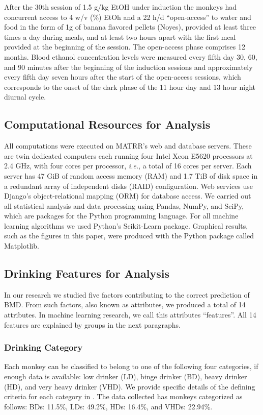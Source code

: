 \documentclass{bmcart}
\begin{document}
After the 30th session of 1.5 g/kg EtOH under induction the monkeys had
concurrent access to 4 w/v (\%) EtOh and a 22 h/d ``open-access'' to water and food
in the form of 1g of banana flavored pellets (Noyes), provided at
least three times a day during meals, and at least two hours apart with the first
meal provided at the beginning of the session. The open-access phase comprises
12 months. Blood ethanol concentration levels were measured every fifth day 30, 60, and 90
minutes after the beginning of the induction sessions and approximately every
fifth day seven hours after the start of the open-access sessions, which
corresponds to the onset of the dark phase of the 11 hour day and 13 hour night 
diurnal cycle.


\subsection*{Computational Resources for Analysis}

All computations were executed on MATRR’s web and database servers. These are
twin dedicated computers each running four Intel Xeon E5620 processors at 2.4
GHz, with four cores per processor, \emph{i.e.}, a total of 16 cores per server.
Each server has 47 GiB of random access memory (RAM) and 1.7 TiB of disk space in
a redundant array of independent disks (RAID) configuration. Web services use
Django's object-relational mapping (ORM) for database access. We carried out
all statistical analysis and data processing using Pandas, NumPy,
and SciPy, which are packages for the Python programming language. For all
machine learning algorithms we used Python’s Scikit-Learn package. Graphical
results, such as the figures in this paper, were produced with the Python 
package called Matplotlib. 


\subsection*{Drinking Features for Analysis}

In our research we studied five factors contributing to the correct prediction
of BMD. From such factors, also known as attributes, we produced a total of 
14 attributes. In machine learning research, we call this attributes
``features''. All 14 features are explained by groups in the next paragraphs.

\subsubsection*{Drinking Category}
Each monkey can be classified to belong to one of the following four
categories, if enough data is available: low drinker (LD), binge drinker (BD),
heavy drinker (HD), and very heavy drinker (VHD). We provide specific details
of the defining criteria for each category in \cite{baker2014chronic}. The data
collected has monkeys categorized as follows: BDs: 11.5\%, LDs: 49.2\%, HDs:
16.4\%, and VHDs: 22.94\%. 
\end{document}
